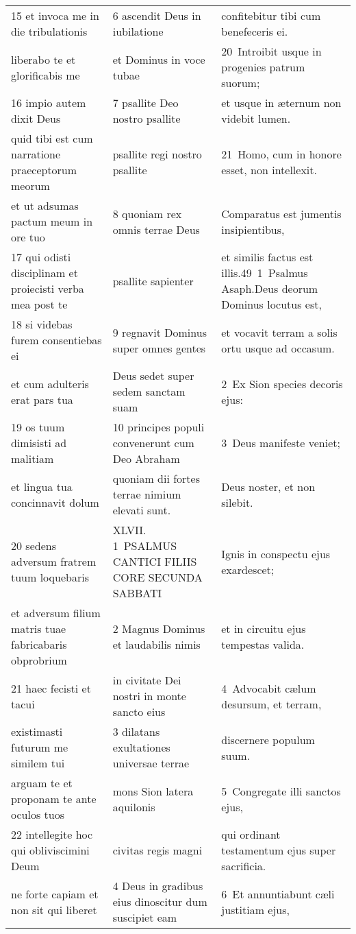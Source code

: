 \documentclass{article}
\begin{document}
\begin{longtable}{@{}p{}p{}p{}@{}}
15 et invoca me in die tribulationis	&	6 ascendit Deus in iubilatione	&	confitebitur tibi cum benefeceris ei.	\\
liberabo te et glorificabis me	&	et Dominus in voce tubae	&	20 Introibit usque in progenies patrum suorum;	\\
16 impio autem dixit Deus	&	7 psallite Deo nostro psallite	&	et usque in æternum non videbit lumen.	\\
quid tibi est cum narratione praeceptorum meorum	&	psallite regi nostro psallite	&	21 Homo, cum in honore esset, non intellexit.	\\
et ut adsumas pactum meum in ore tuo	&	8 quoniam rex omnis terrae Deus	&	Comparatus est jumentis insipientibus,	\\
17 qui odisti disciplinam et proiecisti verba mea post te	&	psallite sapienter	&	et similis factus est illis.49 1 Psalmus Asaph.Deus deorum Dominus locutus est,	\\
18 si videbas furem consentiebas ei	&	9 regnavit Dominus super omnes gentes	&	et vocavit terram a solis ortu usque ad occasum.	\\
et cum adulteris erat pars tua	&	Deus sedet super sedem sanctam suam	&	2 Ex Sion species decoris ejus:	\\
19 os tuum dimisisti ad malitiam	&	10 principes populi convenerunt cum Deo Abraham	&	3 Deus manifeste veniet;	\\
et lingua tua concinnavit dolum	&	quoniam dii fortes terrae nimium elevati sunt.	&	Deus noster, et non silebit.	\\
20 sedens adversum fratrem tuum loquebaris	&	XLVII. 1 PSALMUS CANTICI FILIIS CORE SECUNDA SABBATI	&	Ignis in conspectu ejus exardescet;	\\
et adversum filium matris tuae fabricabaris obprobrium	&	2 Magnus Dominus et laudabilis nimis	&	et in circuitu ejus tempestas valida.	\\
21 haec fecisti et tacui	&	in civitate Dei nostri in monte sancto eius	&	4 Advocabit cælum desursum, et terram,	\\
existimasti futurum me similem tui	&	3 dilatans exultationes universae terrae	&	discernere populum suum.	\\
arguam te et proponam te ante oculos tuos	&	mons Sion latera aquilonis	&	5 Congregate illi sanctos ejus,	\\
22 intellegite hoc qui obliviscimini Deum	&	civitas regis magni	&	qui ordinant testamentum ejus super sacrificia.	\\
ne forte capiam et non sit qui liberet	&	4 Deus in gradibus eius dinoscitur dum suscipiet eam	&	6 Et annuntiabunt cæli justitiam ejus,	\\

\end{longtable}
\end{document}
